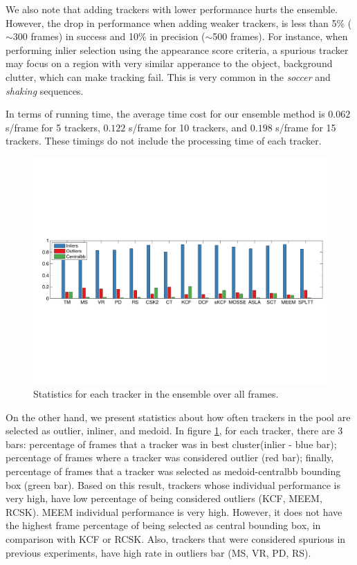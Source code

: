 

We also note that adding trackers with lower performance hurts the ensemble.
However, the drop in performance when adding
weaker trackers, is less than 5\% ($\sim$300 frames) in success and 10\% in
precision ($\sim$500 frames). For instance, when performing inlier selection using
the
appearance score criteria, a spurious tracker may focus on a region with
very similar apperance to the object, \eg background clutter, which can
make tracking fail.
This is very common in the \textit{soccer} and \textit{shaking}
sequences.

In terms of running time, the average time cost for our ensemble
method is $0.062$ s/frame for 5
trackers, $0.122$ s/frame for 10 trackers, and $0.198$ s/frame for 15 trackers.
These timings do not include the processing time of each tracker.

\begin{figure}[h!]
\centering
\includegraphics[width=1.0\linewidth, trim= 0.7cm 7.6cm 0.3cm 7.8cm, clip=true]{Figures/stats.pdf}
\caption{\small Statistics for each tracker in the ensemble over all frames. }
\label{fig:stats}
\end{figure}

On the other hand, we present statistics about how often trackers in the pool
are selected as outlier, inliner, and medoid.
In figure
\ref{fig:stats}, for each tracker, there are 3 bars: percentage of frames that a
tracker was in best cluster(inlier - blue bar); percentage of frames where a
tracker was considered outlier (red bar); finally, percentage of frames that a
tracker was selected as medoid-centralbb bounding box (green bar). Based on this result,
trackers whose individual performance is very high, have low percentage of being
considered outliers (KCF, MEEM, RCSK). MEEM individual performance is very high.
However, it does not have the highest frame percentage of being selected as
central bounding box, in comparison with KCF or RCSK. Also, trackers that were
considered spurious in previous experiments, have high rate in outliers bar
(MS, VR, PD, RS). 

